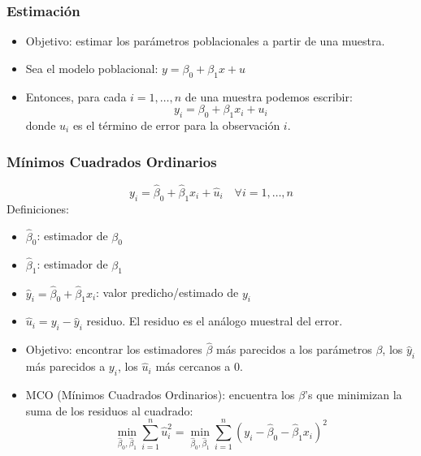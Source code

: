 \documentclass{beamer}
\begin{document}
\begin{frame}
	\frametitle{Estimaci\'on} %
\begin{itemize}
  \item Objetivo: estimar los parámetros poblacionales a partir de una muestra.
  \item Sea el modelo poblacional: $y = \beta_0 + \beta_1x + u$
  \item Entonces, para cada $i = 1, \ldots, n$ de una muestra podemos escribir:
  \begin{equation*}
    y_i = \beta_0 + \beta_1x_i + u_i
  \end{equation*}
  donde $u_i$ es el término de error para la observación $i$.
\end{itemize}
\end{frame}	

\begin{frame}
	\frametitle{Mínimos Cuadrados Ordinarios}  %
\[ {y}_i = \hat{\beta}_0 + \hat{\beta}_1 x_i + \hat{u}_i \quad \forall i = 1, \ldots, n \]
Definiciones:
\begin{itemize}
 \item $\hat{\beta}_0$: estimador de $\beta_0$
    \item $\hat{\beta}_1$: estimador de $\beta_1$
    \item $\hat{y}_i = \hat{\beta}_0 + \hat{\beta}_1 x_i$: valor predicho/estimado de $y_i$
    \item $\hat{u}_i = y_i - \hat{y}_i$ residuo. El residuo es el análogo muestral del error.
    \item Objetivo: encontrar los estimadores \(\hat{\beta}\) más parecidos a los parámetros \(\beta\), los \(\hat{y}_i\) más parecidos a \(y_i\), los \(\hat{u}_i\) más cercanos a 0.\\
    \item MCO (Mínimos Cuadrados Ordinarios): encuentra los \(\beta\)'s que minimizan la suma de los residuos al cuadrado:
\[ \min_{\hat{\beta}_0, \hat{\beta}_1} \sum_{i=1}^{n} \hat{u}_i^2 = \min_{\hat{\beta}_0, \hat{\beta}_1} \sum_{i=1}^{n} (y_i - \hat{\beta}_0 - \hat{\beta}_1 x_i)^2 \]
\end{itemize}
\end{frame}	
\end{document}
